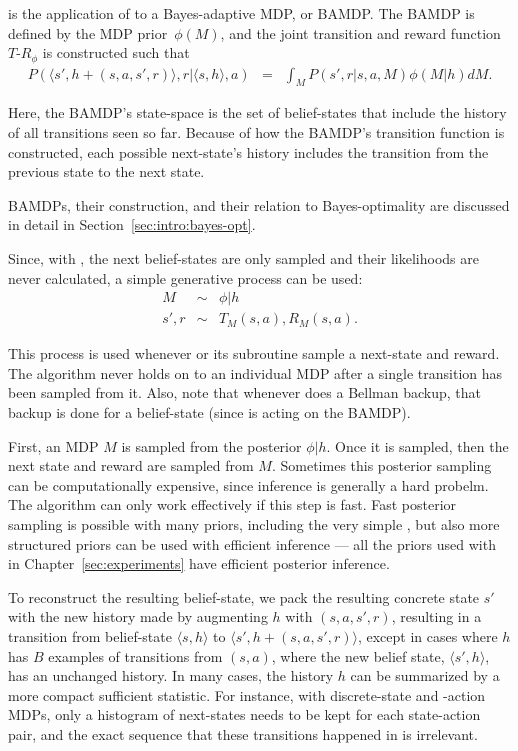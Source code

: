  is the application of  to a Bayes-adaptive MDP, or BAMDP. The BAMDP is defined by the MDP prior~$\phi(M)$, and the joint transition and reward function ${T\mbox{-}R}_\phi$ is constructed such that
\begin{eqnarray*}
P(\langle s', h + (s,a,s',r)\rangle, r | \langle s, h\rangle, a) &=& \int_M P(s', r | s, a, M)\phi(M|h) dM.
\end{eqnarray*}

Here, the BAMDP's state-space is the set of belief-states that include the history of all transitions seen so far. Because of how the BAMDP's transition function is constructed, each possible next-state's history includes the transition from the previous state to the next state.

BAMDPs, their construction, and their relation to Bayes-optimality are discussed in detail in Section~\ref{sec:intro:bayes-opt}.

Since, with , the next belief-states are only sampled and their likelihoods are never calculated, a simple generative process can be used:
\begin{eqnarray}
M &\sim& \phi|h \label{eq:oracle1}\\
s', r &\sim& T_M(s,a), R_M(s,a).\label{eq:oracle2}
\end{eqnarray}

This process is used whenever  or its subroutine  sample a next-state and reward. The algorithm never holds on to an individual MDP after a single transition has been sampled from it. Also, note that whenever  does a Bellman backup, that backup is done for a belief-state (since  is acting on the BAMDP).

First, an MDP $M$ is sampled from the posterior $\phi|h$. Once it is sampled, then the next state and reward are sampled from $M$. Sometimes this posterior sampling can be computationally expensive, since inference is generally a hard probelm. The  algorithm can only work effectively if this step is fast. Fast posterior sampling is possible with many priors, including the very simple , but also more structured priors can be used with efficient inference --- all the priors used with  in Chapter~\ref{sec:experiments} have efficient posterior inference.

To reconstruct the resulting belief-state, we pack the resulting concrete state $s'$ with the new history made by augmenting $h$ with $(s, a, s', r)$, resulting in a transition from belief-state $\langle s, h\rangle$ to $\langle s', h + (s,a,s',r)\rangle$, except in cases where $h$ has $B$ examples of transitions from $(s,a)$, where the new belief state, $\langle s', h \rangle$, has an unchanged history.  In many cases, the history $h$ can be summarized by a more compact sufficient statistic. For instance, with discrete-state and -action MDPs, only a histogram of next-states needs to be kept for each state-action pair, and the exact sequence that these transitions happened in is irrelevant.

